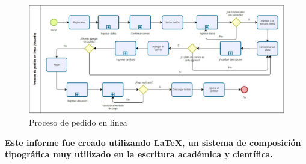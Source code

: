 \documentclass{article}
\begin{document}
\begin{doublespace}
\begin{itemize}
        \begin{figure}[H]
            \centering
            \vspace*{1cm}
            \includegraphics[width=14cm]{Diagrama de Procesos/Proceso de pedido en linea.jpg}
            \caption{Proceso de pedido en linea}
            \label{fig:proceso-pedido-en-linea}
        \end{figure}
    \end{itemize}

    \begin{center}
        \textbf{Este informe fue creado utilizando \LaTeX, un sistema de composición tipográfica muy utilizado en la escritura académica y científica.}
    \end{center}

\end{doublespace}
\end{document}
